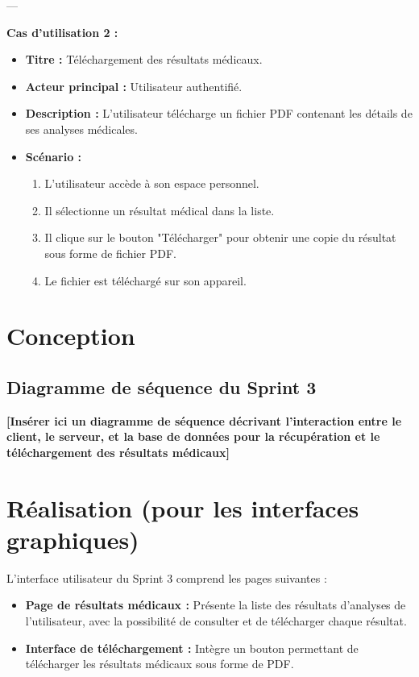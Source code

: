 \documentclass[12pt,a4paper]{report}
\begin{document}
---

\textbf{Cas d’utilisation 2 :}

\begin{itemize}
    \item \textbf{Titre :} Téléchargement des résultats médicaux.
    \item \textbf{Acteur principal :} Utilisateur authentifié.
    \item \textbf{Description :} L'utilisateur télécharge un fichier PDF contenant les détails de ses analyses médicales.
    \item \textbf{Scénario :}
    \begin{enumerate}
        \item L'utilisateur accède à son espace personnel.
        \item Il sélectionne un résultat médical dans la liste.
        \item Il clique sur le bouton "Télécharger" pour obtenir une copie du résultat sous forme de fichier PDF.
        \item Le fichier est téléchargé sur son appareil.
    \end{enumerate}
\end{itemize}

\section{Conception}

\subsection{Diagramme de séquence du Sprint 3}

\textbf{[Insérer ici un diagramme de séquence décrivant l'interaction entre le client, le serveur, et la base de données pour la récupération et le téléchargement des résultats médicaux]}

\section{Réalisation (pour les interfaces graphiques)}

L'interface utilisateur du Sprint 3 comprend les pages suivantes :

\begin{itemize}
    \item \textbf{Page de résultats médicaux :} Présente la liste des résultats d'analyses de l'utilisateur, avec la possibilité de consulter et de télécharger chaque résultat.
    \item \textbf{Interface de téléchargement :} Intègre un bouton permettant de télécharger les résultats médicaux sous forme de PDF.
\end{itemize}
\end{document}
